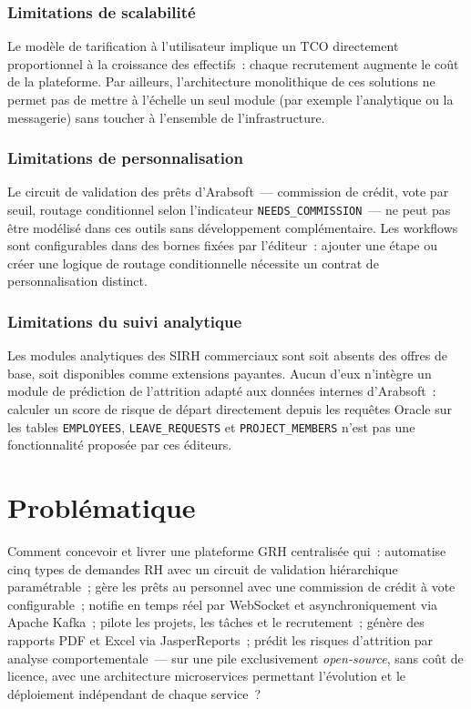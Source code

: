 \subsubsection*{Limitations de scalabilité}

Le modèle de tarification à l'utilisateur implique un TCO directement
proportionnel à la croissance des effectifs~: chaque recrutement augmente le
coût de la plateforme. Par ailleurs, l'architecture monolithique de ces solutions
ne permet pas de mettre à l'échelle un seul module (par exemple l'analytique ou
la messagerie) sans toucher à l'ensemble de l'infrastructure.

\subsubsection*{Limitations de personnalisation}

Le circuit de validation des prêts d'Arabsoft~--- commission de crédit, vote
par seuil, routage conditionnel selon l'indicateur \texttt{NEEDS\_COMMISSION}~---
ne peut pas être modélisé dans ces outils sans développement complémentaire.
Les workflows sont configurables dans des bornes fixées par l'éditeur~: ajouter
une étape ou créer une logique de routage conditionnelle nécessite un contrat
de personnalisation distinct.

\subsubsection*{Limitations du suivi analytique}

Les modules analytiques des SIRH commerciaux sont soit absents des offres de
base, soit disponibles comme extensions payantes. Aucun d'eux n'intègre un module
de prédiction de l'attrition adapté aux données internes d'Arabsoft~: calculer
un score de risque de départ directement depuis les requêtes Oracle sur les tables
\texttt{EMPLOYEES}, \texttt{LEAVE\_REQUESTS} et \texttt{PROJECT\_MEMBERS} n'est
pas une fonctionnalité proposée par ces éditeurs.

\section{Problématique}

\begin{tcolorbox}[colback=blue!5, colframe=headerblue,
                  title=\textbf{Problématique centrale}]
Comment concevoir et livrer une plateforme GRH centralisée qui~:
automatise cinq types de demandes RH avec un circuit de validation hiérarchique
paramétrable~; gère les prêts au personnel avec une commission de crédit à vote
configurable~; notifie en temps réel par WebSocket et asynchroniquement via
Apache Kafka~; pilote les projets, les tâches et le recrutement~; génère des
rapports PDF et Excel via JasperReports~; prédit les risques d'attrition par
analyse comportementale~--- sur une pile exclusivement \textit{open-source},
sans coût de licence, avec une architecture microservices permettant l'évolution
et le déploiement indépendant de chaque service~?
\end{tcolorbox}

